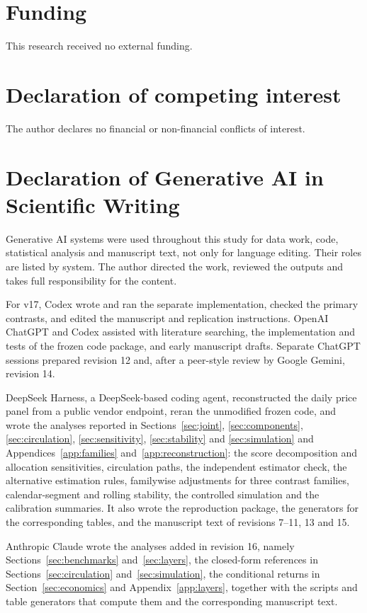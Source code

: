 \ifblind\else
\section*{Funding}
This research received no external funding.
\section*{Declaration of competing interest}
The author declares no financial or non-financial conflicts of interest.
\fi
\section*{Declaration of Generative AI in Scientific Writing}
Generative AI systems were used throughout this study for data work, code, statistical analysis and manuscript text, not only for language editing. Their roles are listed by system. The author directed the work, reviewed the outputs and takes full responsibility for the content.

For v17, Codex wrote and ran the separate implementation, checked the primary contrasts, and edited the manuscript and replication instructions. OpenAI ChatGPT and Codex assisted with literature searching, the implementation and tests of the frozen code package, and early manuscript drafts. Separate ChatGPT sessions prepared revision 12 and, after a peer-style review by Google Gemini, revision 14.

DeepSeek Harness, a DeepSeek-based coding agent, reconstructed the daily price panel from a public vendor endpoint, reran the unmodified frozen code, and wrote the analyses reported in Sections~\ref{sec:joint}, \ref{sec:components}, \ref{sec:circulation}, \ref{sec:sensitivity}, \ref{sec:stability} and \ref{sec:simulation} and Appendices~\ref{app:families} and~\ref{app:reconstruction}: the score decomposition and allocation sensitivities, circulation paths, the independent estimator check, the alternative estimation rules, familywise adjustments for three contrast families, calendar-segment and rolling stability, the controlled simulation and the calibration summaries. It also wrote the reproduction package, the generators for the corresponding tables, and the manuscript text of revisions 7--11, 13 and 15.

Anthropic Claude wrote the analyses added in revision 16, namely Sections~\ref{sec:benchmarks} and~\ref{sec:layers}, the closed-form references in Sections~\ref{sec:circulation} and~\ref{sec:simulation}, the conditional returns in Section~\ref{sec:economics} and Appendix~\ref{app:layers}, together with the scripts and table generators that compute them and the corresponding manuscript text.

